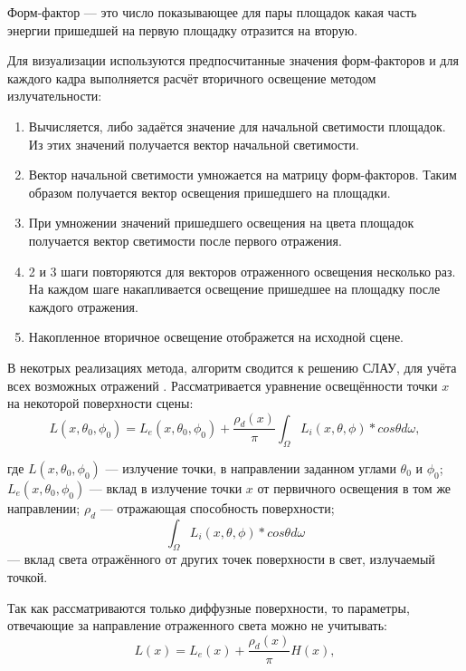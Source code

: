 \documentclass[12pt,fleqn]{article}
\begin{document}
Форм-фактор --- это число показывающее для пары площадок какая часть энергии пришедшей на первую площадку отразится на вторую.

Для визуализации используются предпосчитанные значения форм-факторов и для каждого кадра выполняется расчёт вторичного освещение методом излучательности:

\begin{enumerate}

\item Вычисляется, либо задаётся значение для начальной светимости площадок. Из этих значений получается вектор начальной светимости.

\item Вектор начальной светимости умножается на матрицу форм-факторов. Таким образом получается вектор освещения пришедшего на площадки.

\item При умножении значений пришедшего освещения на цвета площадок получается вектор светимости после первого отражения.

\item 2 и 3 шаги повторяются для векторов отраженного освещения несколько раз. На каждом шаге накапливается освещение пришедшее на площадку после каждого отражения.

\item Накопленное вторичное освещение отображется на исходной сцене.

\end{enumerate}

В некотрых реализациях метода, алгоритм сводится к решению СЛАУ, для учёта всех возможных отражений \cite{RadiosityGI}. Рассматривается уравнение освещённости точки $x$ на некоторой поверхности сцены:
\begin{equation*}
L(x, \theta_0, \phi_0) = L_e(x, \theta_0, \phi_0) + \frac{\rho_d(x)}{\pi} \int_\Omega L_i(x, \theta, \phi) * cos \theta d \omega,
\end{equation*}

где $L(x, \theta_0, \phi_0)$ --- излучение точки, в направлении заданном углами $\theta_0$ и $\phi_0$; $L_e(x, \theta_0, \phi_0)$ --- вклад в излучение точки $x$ от первичного освещения в том же направлении; $\rho_d$ --- отражающая способность поверхности; $$\int_\Omega L_i(x, \theta, \phi) * cos \theta d \omega$$ --- вклад света отражённого от других точек поверхности в свет, излучаемый точкой. 

Так как рассматриваются только диффузные поверхности, то параметры, отвечающие за направление отраженного света можно не учитывать:
\begin{equation*}
L(x) = L_e(x) + \frac{\rho_d(x)}{\pi} H(x),
\end{equation*}
\end{document}
